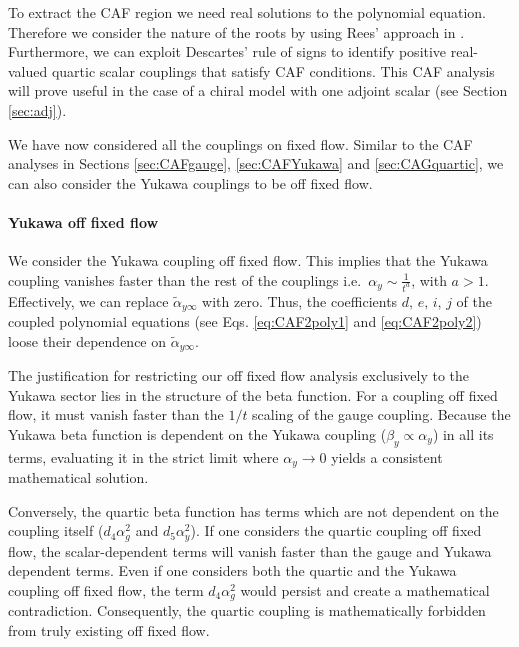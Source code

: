 To extract the CAF region we need real solutions to the polynomial equation. Therefore we consider the nature of the roots by using Rees' approach in \cite{Rees1922}. Furthermore, we can exploit Descartes' rule of signs \cite{Wang2004} to identify positive real-valued quartic scalar couplings that satisfy CAF conditions. This CAF analysis will prove useful in the case of a chiral model with one adjoint scalar (see Section \ref{sec:adj}). 

We have now considered all the couplings on fixed flow. Similar to the CAF analyses in Sections \ref{sec:CAFgauge}, \ref{sec:CAFYukawa} and \ref{sec:CAGquartic}, we can also consider the Yukawa couplings to be off fixed flow. 

\paragraph{Yukawa off fixed flow}
We consider the Yukawa coupling off fixed flow. This implies that the Yukawa coupling vanishes faster than the rest of the couplings i.e.\ ${\alpha_y}\sim\frac{1}{t^a}$, with $a>1$. Effectively, we can replace $\tilde\alpha_{y\infty}$ with zero. Thus, the coefficients $d,\,e,\,i,\,j$ of the coupled polynomial equations (see Eqs. \eqref{eq:CAF2poly1} and \eqref{eq:CAF2poly2}) loose their dependence on $\tilde\alpha_{y\infty}$.

The justification for restricting our off fixed flow analysis exclusively to the Yukawa sector lies in the structure of the beta function. For a coupling off fixed flow, it must vanish faster than the $1/t$ scaling of the gauge coupling. Because the Yukawa beta function is dependent on the Yukawa coupling ($\beta_y \propto \alpha_y$) in all its terms, evaluating it in the strict limit where $\alpha_y \to 0$ yields a consistent mathematical solution. 

Conversely, the quartic beta function has terms which are not dependent on the coupling itself ($d_4 \alpha_g^2$ and $d_5\alpha_y^2$). If one considers the quartic coupling off fixed flow, the scalar-dependent terms will vanish faster than the gauge and Yukawa dependent terms. Even if one considers both the quartic and the Yukawa coupling off fixed flow, the term $d_4 \alpha_g^2$ would persist and create a mathematical contradiction. Consequently, the quartic coupling is mathematically forbidden from truly existing off fixed flow.


